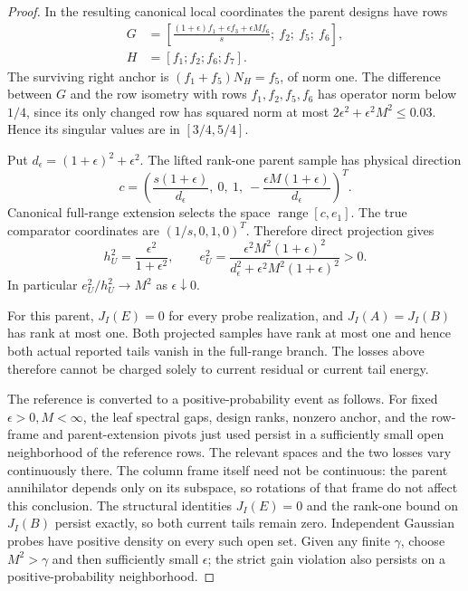 \documentclass[11pt,oneside,openany,a4paper]{book}
\numberwithin{equation}{chapter}
\theoremstyle{definition}
\theoremstyle{remark}
\DeclareMathOperator{\ran}{range}\DeclareMathOperator{\OPT}{OPT}
\begin{document}
\begin{proof}
In the resulting canonical local coordinates the parent designs have rows
\begin{align*}
 G&=\left[
 \frac{(1+\epsilon)f_1+\epsilon f_3+\epsilon Mf_6}{s};\
 f_2;\ f_5;\ f_6\right],\\
 H&=[f_1;f_2;f_6;f_7].
\end{align*}
The surviving right anchor is $(f_1+f_5)N_H=f_5$, of norm one. The difference between $G$ and the row isometry with rows $f_1,f_2,f_5,f_6$ has operator norm below $1/4$, since its only changed row has squared norm at most $2\epsilon^2+\epsilon^2M^2\le0.03$. Hence its singular values are in $[3/4,5/4]$.

Put $d_\epsilon=(1+\epsilon)^2+\epsilon^2$. The lifted rank-one parent sample has physical direction
\[
 c=\left(\frac{s(1+\epsilon)}{d_\epsilon},\ 0,\ 1,\
          -\frac{\epsilon M(1+\epsilon)}{d_\epsilon}\right)^T.
\]
Canonical full-range extension selects the space $\ran[c,e_1]$. The true comparator coordinates are $(1/s,0,1,0)^T$. Therefore direct projection gives
\begin{equation}\label{return:eq:exampleformulas}
 \boxed{h_U^2=\frac{\epsilon^2}{1+\epsilon^2},\qquad
 e_U^2=\frac{\epsilon^2M^2(1+\epsilon)^2}
 {d_\epsilon^2+\epsilon^2M^2(1+\epsilon)^2}>0.}
\end{equation}
In particular $e_U^2/h_U^2\longrightarrow M^2$ as $\epsilon\downarrow0$.

For this parent, $J_I(E)=0$ for every probe realization, and $J_I(A)=J_I(B)$ has rank at most one. Both projected samples have rank at most one and hence both actual reported tails vanish in the full-range branch. The losses above therefore cannot be charged solely to current residual or current tail energy.

The reference is converted to a positive-probability event as follows. For fixed $\epsilon>0,M<\infty$, the leaf spectral gaps, design ranks, nonzero anchor, and the row-frame and parent-extension pivots just used persist in a sufficiently small open neighborhood of the reference rows. The relevant spaces and the two losses vary continuously there. The column frame itself need not be continuous: the parent annihilator depends only on its subspace, so rotations of that frame do not affect this conclusion. The structural identities $J_I(E)=0$ and the rank-one bound on $J_I(B)$ persist exactly, so both current tails remain zero. Independent Gaussian probes have positive density on every such open set. Given any finite $\gamma$, choose $M^2>\gamma$ and then sufficiently small $\epsilon$; the strict gain violation also persists on a positive-probability neighborhood.
\end{proof}
\end{document}
